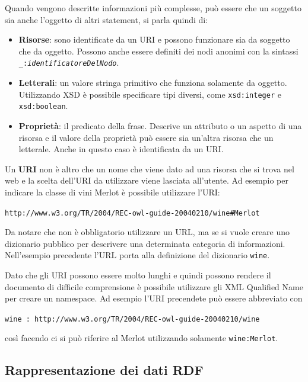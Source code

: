 Quando vengono descritte informazioni più complesse, può essere che un soggetto sia anche l'oggetto di altri statement, si parla quindi di:

\begin{itemize}
	\item \textbf{Risorse}: sono identificate da un URI e possono funzionare sia da soggetto che da oggetto. Possono anche essere definiti dei nodi anonimi con la sintassi \texttt{\_:\textit{identificatoreDelNodo}}.
	\item \textbf{Letterali}: un valore stringa primitivo che funziona solamente da oggetto. Utilizzando XSD è possibile specificare tipi diversi, come \texttt{xsd:integer} e \texttt{xsd:boolean}.
	\item \textbf{Proprietà}: il predicato della frase. Descrive un attributo o un aspetto di una risorsa e il valore della proprietà può essere sia un'altra risorsa che un letterale. Anche in questo caso è identificata da un URI. 
\end{itemize}

Un \textbf{URI} non è altro che un nome che viene dato ad una risorsa che si trova nel web e la scelta dell'URI da utilizzare viene lasciata all'utente.
Ad esempio per indicare la classe di vini Merlot è possibile utilizzare l'URI:

\begin{center}
	\texttt{http://www.w3.org/TR/2004/REC-owl-guide-20040210/wine\#Merlot}
\end{center}

Da notare che non è obbligatorio utilizzare un URL, ma se si vuole creare uno dizionario pubblico per descrivere una determinata categoria di informazioni. Nell'esempio precedente l'URL porta alla definizione del dizionario \texttt{wine}.

Dato che gli URI possono essere molto lunghi e quindi possono rendere il documento di difficile comprensione è possibile utilizzare gli XML Qualified Name per creare un namespace.
Ad esempio l'URI precendete può essere abbreviato con 

\begin{center}
	\texttt{wine : http://www.w3.org/TR/2004/REC-owl-guide-20040210/wine}
\end{center}

\noindent così facendo ci si può riferire al Merlot utilizzando solamente \texttt{wine:Merlot}.

\subsection{Rappresentazione dei dati RDF}

